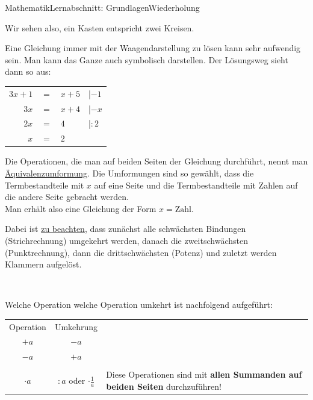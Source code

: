 \documentclass[11pt,twocolumn,oneside,openany,headings=optiontotoc,11pt,numbers=noenddot]{article}
\begin{document}
\begin{worksheet}{Mathematik}{Lernabschnitt: Grundlagen}{Wiederholung}
\begin{framed}
			\raggedright
			Wir sehen also, ein Kasten entspricht zwei Kreisen.\\
		\end{framed}
		\par\bigskip\noindent
		Eine Gleichung immer mit der Waagendarstellung zu lösen kann sehr aufwendig sein. Man kann das Ganze auch symbolisch darstellen. Der Lösungsweg sieht dann so aus:
		\begin{tabularx}{0.5\textwidth}{rcll}
			\(3x + 1\) & \(=\) & \(x+5\) & |\(-1\)\\
			\(3x\) & \(=\) & \(x+4\) & |\(-x\)\\
			\(2x\) & \(=\) & \(4\) & |\(:2\)\\
			\(x\) & \(=\) & \(2\)
		\end{tabularx}
		Die Operationen, die man auf beiden Seiten der Gleichung durchführt, nennt man \underline{Äquivalenzumformung}. Die Umformungen sind so gewählt, dass die Termbestandteile mit \(x\) auf eine Seite und die Termbestandteile mit Zahlen auf die andere Seite gebracht werden.\\
		Man erhält also eine Gleichung der Form \(x = \text{Zahl}\).\\
		\par\bigskip\noindent
		Dabei ist \underline{zu beachten}, dass zunächst alle schwächsten Bindungen (\color{blue}Stri\normalcolor{}chrechnung) umgekehrt werden, danach die zweitschwächsten (\color{blue}Pu\normalcolor{}nktrechnung), dann die drittschwächsten (\color{blue}Po\normalcolor{}tenz) und zuletzt werden \color{blue}Kla\normalcolor{}mmern aufgelöst.\\
		\par\bigskip\noindent
		\centering
		\\
		\raggedright
		\par\bigskip\noindent
		Welche Operation welche Operation umkehrt ist nachfolgend aufgeführt:
		\begin{tabularx}{0.45\textwidth}{|c|c|X|}
			\cline{1-2}
			Operation & Umkehrung & \multicolumn{1}{l}{}\\
			\cline{1-2}
			\(+a\) & \(-a\) & \multicolumn{1}{l}{} \\
			\cline{1-2}
			\(-a\) & \(+a\) & \multicolumn{1}{l}{} \\
			\hline
			\multicolumn{1}{|l|}{} & & \\
			\(\cdot{}a\) & \(:a\) oder \(\cdot{}\frac{1}{a}\) &
			\multirow{7}{0.1\textheight}{Diese Operationen sind mit \textbf{allen Summanden auf beiden Seiten} durchzuführen!}\\

\end{tabularx}
\end{worksheet}
\end{document}
